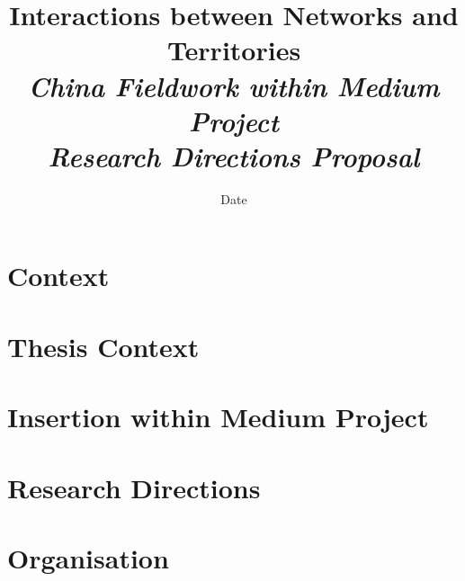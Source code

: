 


\title{Interactions between Networks and Territories\\
\textit{China Fieldwork within Medium Project}\\
\textit{Research Directions Proposal}
}
\author{}
\date{Date}


\maketitle

\justify


\begin{abstract}

\end{abstract}



\section{Context}

\section{Thesis Context}


\section{Insertion within Medium Project}




\section{Research Directions}





\section{Organisation}












